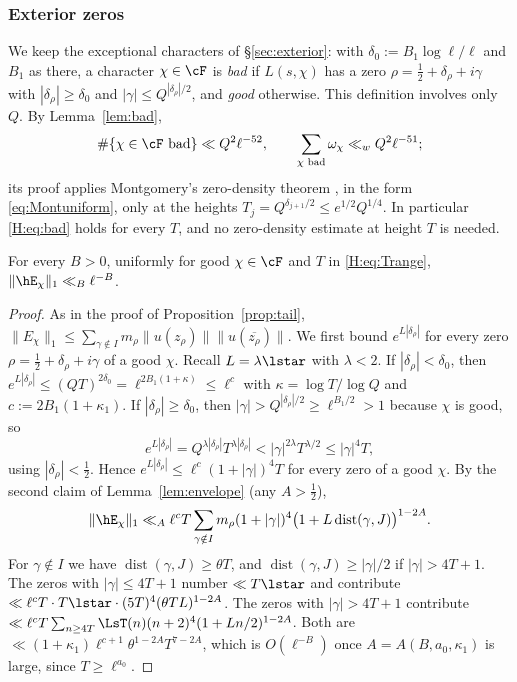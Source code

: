 \subsubsection*{Exterior zeros}\label{H:sec:exterior}
We keep the exceptional characters of \S\ref{sec:exterior}: with $\delta_0:=B_1\log\ell/\ell$ and $B_1$ as there, a character $\chi\in\cF$ is \emph{bad} if $L(s,\chi)$ has a zero $\rho=\frac12+\delta_\rho+i\gamma$ with $|\delta_\rho|\ge\delta_0$ and $|\gamma|\le Q^{|\delta_\rho|/2}$, and \emph{good} otherwise. This definition involves only $Q$. By Lemma~\ref{lem:bad},
\begin{equation}\label{H:eq:bad}
\#\{\chi\in\cF\text{ bad}\}\ll Q^2\ell^{-52},\qquad\sum_{\chi\text{ bad}}\omega_\chi\ll_wQ^2\ell^{-51};
\end{equation}
its proof applies Montgomery's zero-density theorem \cite[Thm.~1]{Mon69}, in the form \eqref{eq:Montuniform}, only at the heights $T_j=Q^{\delta_{j+1}/2}\le e^{1/2}Q^{1/4}$. In particular \eqref{H:eq:bad} holds for every $T$, and no zero-density estimate at height $T$ is needed.

\begin{proposition}\label{H:prop:tail}
For every $B>0$, uniformly for good $\chi\in\cF$ and $T$ in \eqref{H:eq:Trange}, $\|\hE_\chi\|_1\ll_B\ell^{-B}$.
\end{proposition}
\begin{proof}
As in the proof of Proposition~\ref{prop:tail}, $\|E_\chi\|_1\le\sum_{\gamma\notin I}m_\rho\|u(z_\rho)\|\|u(\overline{z_\rho})\|$. We first bound $e^{L|\delta_\rho|}$ for every zero $\rho=\frac12+\delta_\rho+i\gamma$ of a good $\chi$. Recall $L=\lambda\lstar$ with $\lambda<2$. If $|\delta_\rho|<\delta_0$, then $e^{L|\delta_\rho|}\le(QT)^{2\delta_0}=\ell^{2B_1(1+\kappa)}\le\ell^{c}$ with $\kappa=\log T/\log Q$ and $c:=2B_1(1+\kappa_1)$. If $|\delta_\rho|\ge\delta_0$, then $|\gamma|>Q^{|\delta_\rho|/2}\ge\ell^{B_1/2}>1$ because $\chi$ is good, so
\[
e^{L|\delta_\rho|}=Q^{\lambda|\delta_\rho|}T^{\lambda|\delta_\rho|}<|\gamma|^{2\lambda}T^{\lambda/2}\le|\gamma|^4T,
\]
using $|\delta_\rho|<\frac12$. Hence $e^{L|\delta_\rho|}\le\ell^c(1+|\gamma|)^4T$ for every zero of a good $\chi$. By the second claim of Lemma~\ref{lem:envelope} (any $A>\frac12$),
\[
\|\hE_\chi\|_1\ll_A\ell^cT\sum_{\gamma\notin I}m_\rho(1+|\gamma|)^4\big(1+L\operatorname{dist}(\gamma,J)\big)^{1-2A}.
\]
For $\gamma\notin I$ we have $\operatorname{dist}(\gamma,J)\ge\theta T$, and $\operatorname{dist}(\gamma,J)\ge|\gamma|/2$ if $|\gamma|>4T+1$. The zeros with $|\gamma|\le4T+1$ number $\ll T\lstar$ and contribute $\ll\ell^cT\cdot T\lstar\cdot(5T)^4(\theta TL)^{1-2A}$. The zeros with $|\gamma|>4T+1$ contribute $\ll\ell^cT\sum_{n\ge4T}\LsT(n)(n+2)^4(1+Ln/2)^{1-2A}$. Both are $\ll(1+\kappa_1)\ell^{c+1}\theta^{1-2A}T^{7-2A}$, which is $O(\ell^{-B})$ once $A=A(B,a_0,\kappa_1)$ is large, since $T\ge\ell^{a_0}$.
\end{proof}

